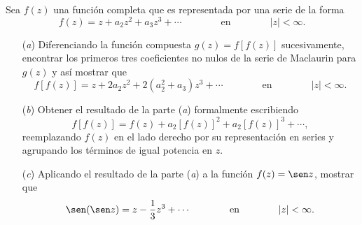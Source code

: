 \documentclass[a4paper]{report}
\begin{document}
Sea \(f(z)\) una función completa que es representada por una serie de la forma 
\[
 f(z)=z+a_2z^2+a_3z^3+\cdots
 \qquad\qquad\textrm{en}\qquad\qquad
 |z|<\infty.
\]
\begin{enumerate}
 \item[(\textit{a})] Diferenciando la función compuesta \(g(z)=f[f(z)]\) sucesivamente, encontrar los primeros tres coeficientes no nulos de la serie de Maclaurin para \(g(z)\) y así mostrar que 
\[
 f[f(z)]=z+2a_2z^2+2(a_2^2+a_3)z^3+\cdots
 \qquad\qquad\textrm{en}\qquad\qquad
 |z|<\infty.
\]
\item[(\textit{b})] Obtener el resultado de la parte (\textit{a}) formalmente escribiendo
\[
 f[f(z)]=f(z)+a_2[f(z)]^2+a_2[f(z)]^3+\cdots,
\]
reemplazando \(f(z)\) en el lado derecho por su representación en series y agrupando los términos de igual potencia
 en \(z\).
\item[(\textit{c})] Aplicando el resultado de la parte (\textit{a}) a la función \(f(z)=\sen z\), mostrar que 
\[
 \sen(\sen z)=z-\frac{1}{3}z^3+\cdots
 \qquad\qquad\textrm{en}\qquad\qquad
 |z|<\infty.
\]
\end{enumerate}
\end{document}

